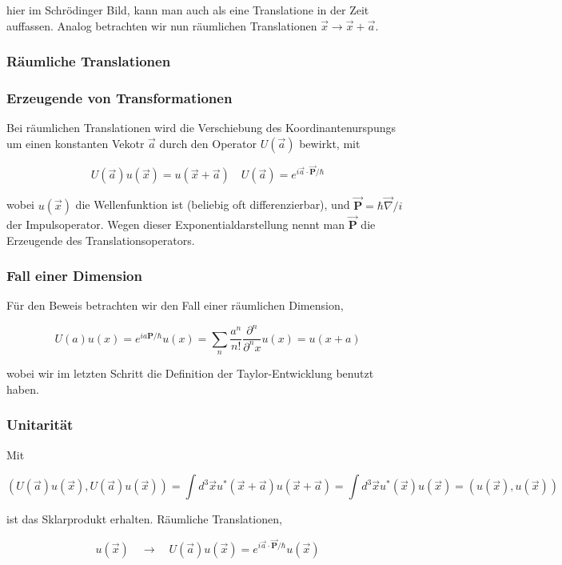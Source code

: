 \documentclass[10pt, letterpaper]{article}
\begin{document}
hier im Schrödinger Bild, kann man auch als eine Translatione in der Zeit auffassen. Analog betrachten wir nun räumlichen Translationen $\vec{x} \rightarrow \vec{x}+\vec{a}$.

\subsubsection*{Räumliche Translationen}
\subsubsection*{Erzeugende von Transformationen}
Bei räumlichen Translationen wird die Verschiebung des Koordinantenurspungs um einen konstanten Vekotr $\vec{a}$ durch den Operator $U(\vec{a})$ bewirkt, mit

$$
U(\vec{a}) u(\vec{x})=u(\vec{x}+\vec{a}) \quad U(\vec{a})=e^{i \vec{a} \cdot \overrightarrow{\mathbf{P}} / \hbar}
$$

wobei $u(\vec{x})$ die Wellenfunktion ist (beliebig oft differenzierbar), und $\overrightarrow{\mathbf{P}}=\hbar \vec{\nabla} / i$ der Impulsoperator. Wegen dieser Exponentialdarstellung nennt man $\overrightarrow{\mathbf{P}}$ die Erzeugende des Translationsoperators.

\subsubsection*{Fall einer Dimension}
Für den Beweis betrachten wir den Fall einer räumlichen Dimension,

$$
U(a) u(x)=e^{i a \mathbf{P} / \hbar} u(x)=\sum_{n} \frac{a^{n}}{n!} \frac{\partial^{n}}{\partial^{n} x} u(x)=u(x+a)
$$

wobei wir im letzten Schritt die Definition der Taylor-Entwicklung benutzt haben.

\subsubsection*{Unitarität}
Mit

$$
(U(\vec{a}) u(\vec{x}), U(\vec{a}) u(\vec{x}))=\int d^{3} \vec{x} u^{*}(\vec{x}+\vec{a}) u(\vec{x}+\vec{a})=\int d^{3} \vec{x} u^{*}(\vec{x}) u(\vec{x})=(u(\vec{x}), u(\vec{x}))
$$

ist das Sklarprodukt erhalten. Räumliche Translationen,

$$
u(\vec{x}) \quad \rightarrow \quad U(\vec{a}) u(\vec{x})=e^{i \vec{a} \cdot \overrightarrow{\mathbf{P}} / \hbar} u(\vec{x})
$$
\end{document}
